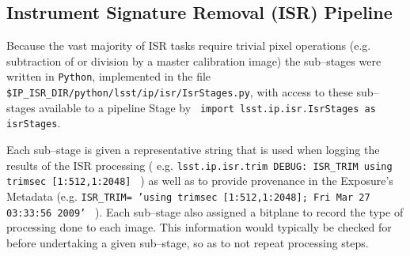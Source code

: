 
\clearpage
\subsection{Instrument Signature Removal (ISR) Pipeline}

Because the vast majority of ISR tasks require trivial pixel
operations (e.g. subtraction of or division by a master calibration
image) the sub--stages were written in {\tt Python}, implemented in
the file {\tt \$IP\_ISR\_DIR/python/lsst/ip/isr/IsrStages.py}, with
access to these sub--stages available to a pipeline Stage by {\tt
import lsst.ip.isr.IsrStages as isrStages}.

Each sub--stage is given a representative string 
%
that is used when logging the results of the ISR processing (
e.g. {\tt lsst.ip.isr.trim DEBUG: ISR\_TRIM using trimsec
[1:512,1:2048] } )
%
as well as to provide provenance in the Exposure's Metadata 
%
(e.g. {\tt ISR\_TRIM= 'using trimsec [1:512,1:2048]; Fri Mar 27
03:33:56 2009' } ).
%
Each sub--stage also assigned a bitplane to record the type of
processing done to each image.  This information would typically be
checked for before undertaking a given sub--stage, so as to not repeat
processing steps.

